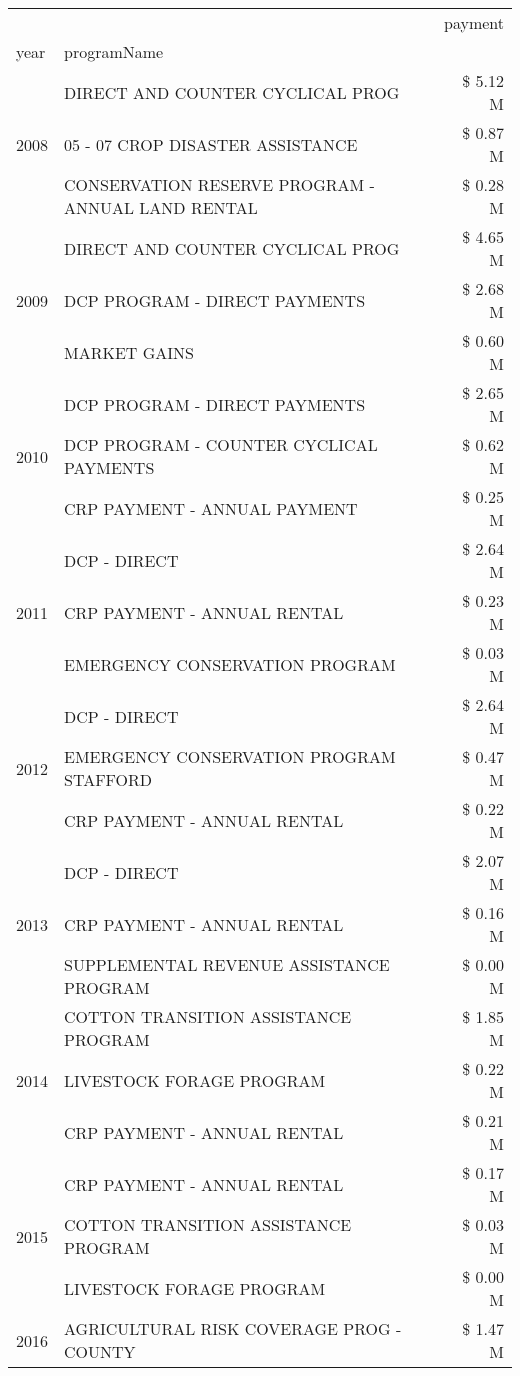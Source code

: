 \begin{tabular}{llr}
\toprule
 &  & payment \\
year & programName &  \\
\midrule
\multirow[t]{3}{*}{2008} & DIRECT AND COUNTER CYCLICAL PROG & \$ 5.12 M \\
 & 05 - 07 CROP DISASTER ASSISTANCE & \$ 0.87 M \\
 & CONSERVATION RESERVE PROGRAM - ANNUAL LAND RENTAL & \$ 0.28 M \\
\cline{1-3}
\multirow[t]{3}{*}{2009} & DIRECT AND COUNTER CYCLICAL PROG & \$ 4.65 M \\
 & DCP PROGRAM - DIRECT PAYMENTS & \$ 2.68 M \\
 & MARKET GAINS & \$ 0.60 M \\
\cline{1-3}
\multirow[t]{3}{*}{2010} & DCP PROGRAM - DIRECT PAYMENTS & \$ 2.65 M \\
 & DCP PROGRAM - COUNTER CYCLICAL PAYMENTS & \$ 0.62 M \\
 & CRP PAYMENT - ANNUAL PAYMENT & \$ 0.25 M \\
\cline{1-3}
\multirow[t]{3}{*}{2011} & DCP - DIRECT & \$ 2.64 M \\
 & CRP PAYMENT - ANNUAL RENTAL & \$ 0.23 M \\
 & EMERGENCY CONSERVATION PROGRAM & \$ 0.03 M \\
\cline{1-3}
\multirow[t]{3}{*}{2012} & DCP - DIRECT & \$ 2.64 M \\
 & EMERGENCY CONSERVATION PROGRAM STAFFORD & \$ 0.47 M \\
 & CRP PAYMENT - ANNUAL RENTAL & \$ 0.22 M \\
\cline{1-3}
\multirow[t]{3}{*}{2013} & DCP - DIRECT & \$ 2.07 M \\
 & CRP PAYMENT - ANNUAL RENTAL & \$ 0.16 M \\
 & SUPPLEMENTAL REVENUE ASSISTANCE PROGRAM & \$ 0.00 M \\
\cline{1-3}
\multirow[t]{3}{*}{2014} & COTTON TRANSITION ASSISTANCE PROGRAM & \$ 1.85 M \\
 & LIVESTOCK FORAGE PROGRAM & \$ 0.22 M \\
 & CRP PAYMENT - ANNUAL RENTAL & \$ 0.21 M \\
\cline{1-3}
\multirow[t]{3}{*}{2015} & CRP PAYMENT - ANNUAL RENTAL & \$ 0.17 M \\
 & COTTON TRANSITION ASSISTANCE PROGRAM & \$ 0.03 M \\
 & LIVESTOCK FORAGE PROGRAM & \$ 0.00 M \\
\cline{1-3}
\multirow[t]{3}{*}{2016} & AGRICULTURAL RISK COVERAGE PROG - COUNTY & \$ 1.47 M \\

\end{tabular}
